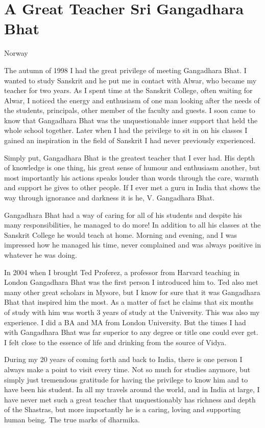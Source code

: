 \chapter{A Great Teacher Sri Gangadhara Bhat}

\begin{center}
\smallskip
Norway

\end{center}
The autumn of 1998 I had the great privilege of meeting Gangadhara Bhat. I wanted to study Sanskrit and he put me in contact with Alwar, who became my teacher for two years. As I spent time at the Sanskrit College, often waiting for Alwar, I noticed the energy and enthusiasm of one man looking after the needs of the students, principals, other member of the faculty and guests. I soon came to know that Gangadhara Bhat was the unquestionable inner support that held the whole school together. Later when I had the privilege to sit in on his classes I gained an inspiration in the field of Sanskrit I had never previously experienced.

Simply put, Gangadhara Bhat is the greatest teacher that I ever had. His depth of knowledge is one thing, his great sense of humour and enthusiasm another, but most importantly his actions speaks louder than words through the care, warmth and support he gives to other people. If I ever met a guru in India that shows the way through ignorance and darkness it is he, V. Gangadhara Bhat.

Gangadhara Bhat had a way of caring for all of his students and despite his many responsibilities, he managed to do more! In addition to all his classes at the Sanskrit College he would teach at home. Morning and evening, and I was impressed how he managed his time, never complained and was always positive in whatever he was doing.

In 2004 when I brought Ted Proferez, a professor from Harvard teaching in London Gangadhara Bhat was the first person I introduced him to. Ted also met many other great scholars in Mysore, but I know for sure that it was Gangadhara Bhat that inspired him the most. As a matter of fact he claims that six months of study with him was worth 3 years of study at the University. This was also my experience. I did a BA and MA from London University. But the times I had with Gangadhara Bhat was far superior to any degree or title one could ever get. I felt close to the essence of life and drinking from the source of Vidya.

During my 20 years of coming forth and back to India, there is one person I always make a point to visit every time. Not so much for studies anymore, but simply just tremendous gratitude for having the privilege to know him and to have been his student. In all my travels around the world, and in India at large, I have never met such a great teacher that unquestionably has richness and depth of the Shastras, but more importantly he is a caring, loving and supporting human being. The true marks of dharmika.

